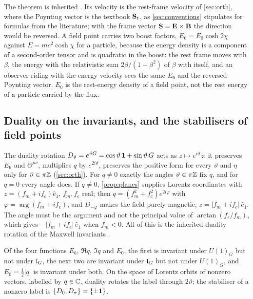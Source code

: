 The theorem is inherited \cite{LandauLifshitz2}. Its velocity is the rest-frame velocity of \cref{sec:orth}, where the Poynting vector is the
textbook $\mathbf S_{\rm t}$, as \cref{sec:conventions} stipulates for formulas from the literature; with the frame vector $\mathbf S=\mathbf E\times\mathbf B$
the direction would be reversed. A field point carries two boost factors, $E_6=E_0\cosh2\chi$ against $E=mc^2\cosh\chi$ for a particle, because the
energy density is a component of a second-order tensor and is quadratic in the boost: the rest frame moves with $\beta$, the energy with the
relativistic sum $2\beta/(1+\beta^2)$ of $\beta$ with itself, and an observer riding with the energy velocity sees the same $E_6$ and the reversed
Poynting vector. $E_0$ is the rest-energy density of a field point, not the rest energy of a particle carried by the flux.

\subsection{Duality on the invariants, and the stabilisers of field points}
\label{sec:energy-duality}

The duality rotation $D_\vartheta=e^{\vartheta G}=\cos\vartheta\,\mathbf 1+\sin\vartheta\,G$ acts as $z\mapsto e^{i\vartheta}z$: it preserves $E_6$ and
$\Theta^{\mu\nu}$, multiplies $q$ by $e^{2i\vartheta}$, preserves the positive form for every $\vartheta$ and $\eta$ only for $\vartheta\in\pi\mathbb{Z}$
(\cref{sec:orth}). For $q\neq0$ exactly the angles $\vartheta\in\pi\mathbb{Z}$ fix $q$, and for $q=0$ every angle does. If $q\neq0$, \cref{prop:planes}
supplies Lorentz coordinates with $z=(f_m+if_e)\hat e_1$, $f_m,f_e$ real; then $q=(f_m^2+f_e^2)e^{2i\varphi}$ with $\varphi=\arg(f_m+if_e)$, and
$D_{-\varphi}$ makes the field purely magnetic, $z=|f_m+if_e|\,\hat e_1$. The angle must be the argument and not the principal value of
$\arctan(f_e/f_m)$, which gives $-|f_m+if_e|\,\hat e_1$ when $f_m<0$. All of this is the inherited duality rotation of the Maxwell invariants
\cite{Rainich1925,Calkin65,DeserTeitelboim76}.

\begin{proposition}
\label{en:doubly}
Of the four functions $E_6$, $\Re q$, $\Im q$ and $E_0$, the first is invariant under $U(1)_G$ but not under $\mathfrak l_G$, the next two are invariant under
$\mathfrak l_G$ but not under $U(1)_G$, and $E_0=\tfrac12|q|$ is invariant under both. On the space of Lorentz orbits of nonzero vectors, labelled by
$q\in\mathbb{C}$, duality rotates the label through $2\vartheta$; the stabiliser of a nonzero label is $\{D_0,D_\pi\}=\{\pm\mathbf 1\}$.
\end{proposition}

